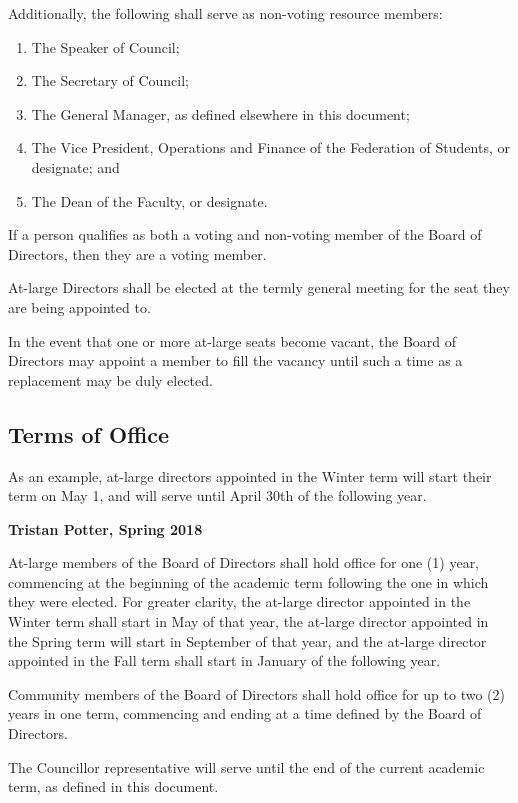 \noindent Additionally, the following shall serve as non-voting resource
members:
\begin{enumerate}
  \item The Speaker of Council;
  \item The Secretary of Council;
  \item The General Manager, as defined elsewhere in this document;
  \item The Vice President, Operations and Finance of the Federation of
      Students, or designate; and
  \item The Dean of the Faculty, or designate.
\end{enumerate}

If a person qualifies as both a voting and non-voting member of the Board of 
Directors, then they are a voting member.

At-large Directors shall be elected at the termly general meeting for the
seat they are being appointed to.

In the event that one or more at-large seats become vacant, the Board of
Directors may appoint a member to fill the vacancy until such a time as a
replacement may be duly elected.

\subsection{Terms of Office}
\begin{annotation}
    As an example, at-large directors appointed in the Winter term will start
    their term on May 1, and will serve until April 30th of the following year.

    \textbf{Tristan Potter, Spring 2018}
\end{annotation}
At-large members of the Board of Directors shall hold office for one (1) year,
commencing at the beginning of the academic term following the one in which
they were elected. For greater clarity, the at-large director appointed in
the Winter term shall start in May of that year, the at-large director 
appointed in the Spring term will start in September of that year, and the
at-large director appointed in the Fall term shall start in January of the 
following year. 

Community members of the Board of Directors shall hold office for up to two (2)
years in one term, commencing and ending at a time defined by the Board of
Directors.

The Councillor representative will serve until the end of the current academic
term, as defined in this document. 

